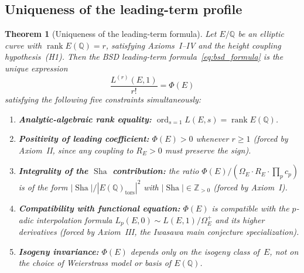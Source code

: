 \documentclass[aps,prd,twocolumn,superscriptaddress,nofootinbib]{revtex4-2}
\newtheorem{theorem}{Theorem}[section]
\theoremstyle{definition}
\theoremstyle{remark}
\DeclareMathOperator{\ord}{ord}
\DeclareMathOperator{\rank}{rank}
\DeclareMathOperator{\Sha}{Sha}
\begin{document}
\subsection{Uniqueness of the leading-term profile}

\begin{theorem}[Uniqueness of the leading-term formula]
\label{thm:uniqueness}
Let $E/\mathbb{Q}$ be an elliptic curve with $\rank E(\mathbb{Q}) = r$, satisfying Axioms~I--IV and the height coupling hypothesis~(H1). Then the BSD leading-term formula~\eqref{eq:bsd_formula} is the \textit{unique} expression
\[
  \frac{L^{(r)}(E,1)}{r!} = \Phi(E)
\]
satisfying the following five constraints simultaneously:
\begin{enumerate}
  \item[\textbf{(U1)}] \textbf{Analytic-algebraic rank equality:} $\ord_{s=1} L(E,s) = \rank E(\mathbb{Q})$.
  \item[\textbf{(U2)}] \textbf{Positivity of leading coefficient:} $\Phi(E) > 0$ whenever $r \geq 1$ (forced by Axiom~II, since any coupling to $R_E > 0$ must preserve the sign).
  \item[\textbf{(U3)}] \textbf{Integrality of the $\Sha$ contribution:} the ratio $\Phi(E)/(\Omega_E \cdot R_E \cdot \prod_p c_p)$ is of the form $|\Sha|/|E(\mathbb{Q})_{\mathrm{tors}}|^2$ with $|\Sha| \in \mathbb{Z}_{>0}$ (forced by Axiom~I).
  \item[\textbf{(U4)}] \textbf{Compatibility with functional equation:} $\Phi(E)$ is compatible with the $p$-adic interpolation formula $L_p(E,0) \sim L(E,1)/\Omega_E^+$ and its higher derivatives (forced by Axiom~III, the Iwasawa main conjecture specialization).
  \item[\textbf{(U5)}] \textbf{Isogeny invariance:} $\Phi(E)$ depends only on the isogeny class of~$E$, not on the choice of Weierstrass model or basis of $E(\mathbb{Q})$.
\end{enumerate}
\end{theorem}
\end{document}
